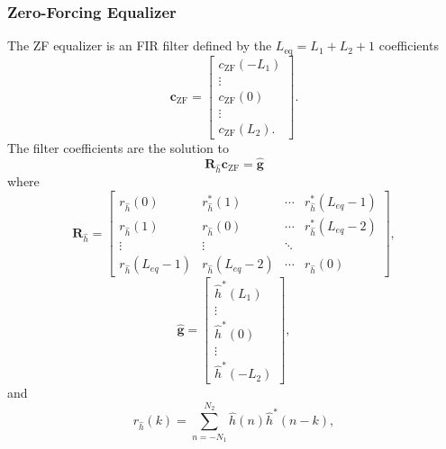 \subsubsection{Zero-Forcing Equalizer}
The ZF equalizer is an FIR filter defined by the $L_\text{eq}=L_1+L_2+1$ coefficients
\begin{equation}
\mathbf{c}_\text{ZF} = 
\begin{bmatrix}
c_\text{ZF}(-L_1) \\ \vdots \\ c_\text{ZF}(0) \\ \vdots \\ c_\text{ZF}(L_2).
\end{bmatrix}.
\end{equation}
The filter coefficients are the solution to \cite{paq-phase1-report:2014}
\begin{equation}
\mathbf{R}_{\hat{h}} \mathbf{c}_\text{ZF} = \hat{\mathbf{g}}
\label{eq:start_here_ZF_MDR}
\end{equation}
where
\begin{equation}
\mathbf{R}_{\hat{h}} = 
		\begin{bmatrix}
		r_{\hat{h}}(0)			& r^\ast_{\hat{h}}(1)	& \cdots 	& r^\ast_{\hat{h}}(L_{eq}-1)  	\\
		r_{\hat{h}}(1) 			& r_{\hat{h}}(0)		& \cdots 	& r^\ast_{\hat{h}}(L_{eq}-2)  	\\
		\vdots	 				& \vdots				& \ddots 	&  								\\
		r_{\hat{h}}(L_{eq}-1)	& r_{\hat{h}}(L_{eq}-2)	& \cdots	& r_{\hat{h}}(0)  			
	\end{bmatrix},
	\label{eq:R_h_MDR}
\end{equation}
\begin{equation}
\hat{\mathbf{g}} = 
\begin{bmatrix} \hat{h}^\ast(L_1) \\ \vdots \\ \hat{h}^\ast(0) \\ \vdots \\ \hat{h}^\ast(-L_2)  \end{bmatrix},
\label{eq:g_MDR}
\end{equation}
and
\begin{equation}
r_{\hat{h}}(k) = \sum_{n=-N_1}^{N_2} \hat{h}(n) \hat{h}^\ast(n-k),
\label{eq:sample_autocorrelation_ZF_MDR}
\end{equation}

